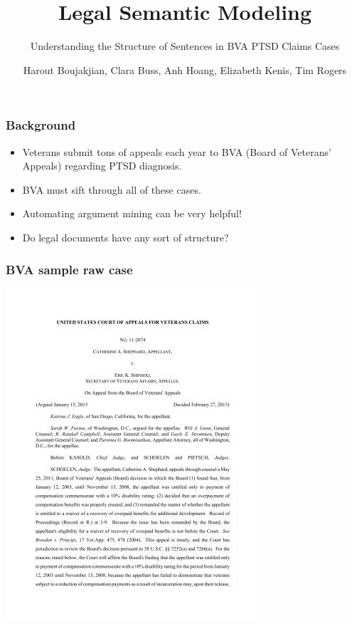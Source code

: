 \documentclass{beamer}
\title{Legal Semantic Modeling}
\subtitle{Understanding the Structure of Sentences in BVA PTSD Claims Cases}
\author{Harout Boujakjian, Clara Buss, Anh Hoang, Elizabeth Kenis, Tim Rogers}
\institute{George Mason University}
\begin{document}
\maketitle


\begin{frame}
  \frametitle{Background}
  \footnotesize
  \begin{itemize}
  \item Veterans submit tons of appeals each year to BVA (Board of Veterans' Appeals) regarding PTSD diagnosis.
  \item BVA must sift through all of these cases.
  \item Automating argument mining can be very helpful!
  \item Do legal documents have any sort of structure?
  \end{itemize}
\end{frame}

\begin{frame}
  \frametitle{BVA sample raw case}
  \centering
  \includegraphics[width=0.6\linewidth]{BVAcase.jpg}
\end{frame}
\end{document}

